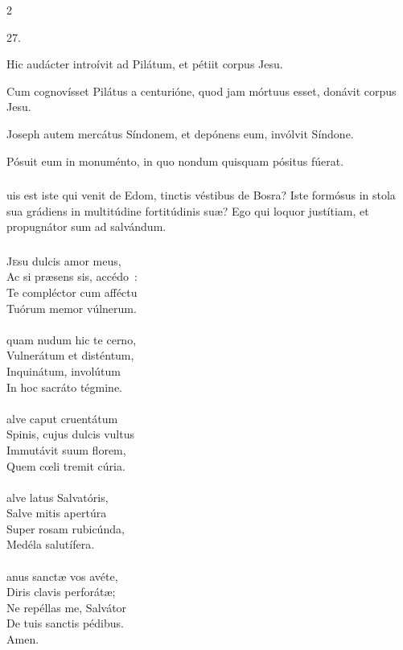 \documentclass[9pt,twoside]{extarticle}
\begin{document}
\begin{multicols}{2}
\begin{tightlist}{}
\item {} 27.
\item {} Hic audácter introívit ad Pilátum, et pétiit corpus Jesu.
\item {} Cum cognovísset Pilátus a centurióne, quod jam mórtuus esset, donávit corpus Jesu.
\item {} Joseph autem mercátus Síndonem, et depónens eum, invólvit Síndone.
\item {} Pósuit eum in monuménto, in quo nondum quisquam pósitus fúerat.
\end{tightlist}

\subsubsection*{}
uis est iste qui venit de Edom, tinctis véstibus de Bosra? Iste formósus in stola sua grádiens in multitúdine fortitúdinis suæ? Ego qui loquor justítiam, et propugnátor sum ad salvándum.

\subsubsection*{\center {}}
\lettrine{J}esu dulcis amor meus,\\
Ac si præsens sis, accédo~:\\
Te compléctor cum afféctu\\
Tuórum memor vúlnerum.\\
\\
 quam nudum hic te cerno,\\
Vulnerátum et disténtum,\\
Inquinátum, involútum\\
In hoc sacráto tégmine.\\
\\
alve caput cruentátum\\
Spinis, cujus dulcis vultus\\
Immutávit suum florem,\\
Quem cœli tremit cúria.\\
\\
alve latus Salvatóris,\\
Salve mitis apertúra\\
Super rosam rubicúnda,\\
Medéla salutífera.\\
\\
anus sanctæ vos avéte,\\
Diris clavis perforátæ;\\
Ne repéllas me, Salvátor\\
De tuis sanctis pédibus.\\
Amen.


\end{multicols}
\end{document}
